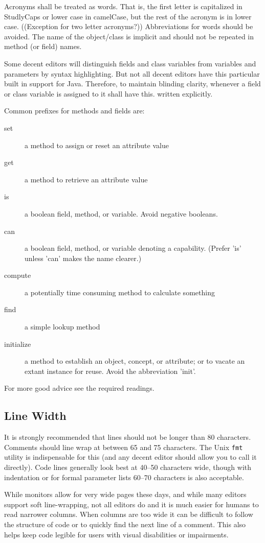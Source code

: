 Acronyms shall be treated as words. That is, the first letter is capitalized in StudlyCaps or lower case in camelCase, but the rest of the acronym is in lower case. ((Exception for two letter acronyms?)) Abbreviations for words should be avoided. The name of the object/class is implicit and should not be repeated in method (or field) names.

Some decent editors will distinguish fields and class variables from variables and parameters by syntax highlighting. But not all decent editors have this particular built in support for Java. Therefore, to maintain blinding clarity, whenever a field or class variable is assigned to it shall have this. written explicitly.

Common prefixes for methods and fields are:

\begin{description}
\item[set] a method to assign or reset an attribute value
\item[get] a method to retrieve an attribute value
\item[is] a boolean field, method, or variable. Avoid negative booleans.
\item[can] a boolean field, method, or variable denoting a capability. (Prefer 'is' unless 'can' makes the name clearer.)
\item[compute] a potentially time consuming method to calculate something
\item[find] a simple lookup method
 \item[initialize] a method to establish an object, concept, or attribute; or to vacate an extant instance for reuse. Avoid the abbreviation 'init'. 
\end{description}

For more good advice see the required readings. 


\subsection{Line Width}

It is strongly recommended that lines should not be longer than 80 characters. Comments should line wrap at between 65 and 75 characters. The Unix {\tt fmt} utility is indispensable for this (and any decent editor should allow you to call it directly). Code lines generally look best at 40--50 characters wide, though with indentation or for formal parameter lists 60--70 characters is also acceptable.

While monitors allow for very wide pages these days, and while many editors support soft line-wrapping, not all editors do and it is much easier for humans to read narrower columns. When columns are too wide it can be difficult to follow the structure of code or to quickly find the next line of a comment. This also helps keep code legible for users with visual disabilities or impairments.


